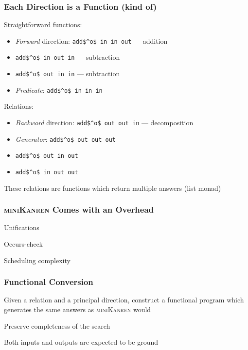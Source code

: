 \documentclass[xcolor=table]{beamer}
\newcommand{\mk}{\textsc{miniKanren}\xspace}
\begin{document}
\begin{frame}[fragile]
  \frametitle{Each Direction is a Function \pause (kind of)}
Straightforward functions:
\begin{itemize}
  \item \emph{Forward} direction: \lstinline{add$^o$ in in out} --- addition
  \item \lstinline{add$^o$ in out in} --- subtraction
  \item \lstinline{add$^o$ out in in} --- subtraction
  \item \emph{Predicate}: \lstinline{add$^o$ in in in}
\end{itemize}

\vfill

Relations:
\begin{itemize}
  \item \emph{Backward} direction: \lstinline{add$^o$ out out in} --- decomposition
  \item \emph{Generator}: \lstinline{add$^o$ out out out}
  \item \lstinline{add$^o$ out in out}
  \item \lstinline{add$^o$ in out out}
\end{itemize}
These relations are functions which return multiple answers (list monad)
\end{frame}

\begin{frame}[fragile]
  \frametitle{\mk Comes with an Overhead}
  \begin{center}
    Unifications
  \end{center}

  \begin{center}
    Occurs-check
  \end{center}

  \begin{center}
    Scheduling complexity
  \end{center}
\end{frame}

\begin{frame}[fragile]
  \frametitle{Functional Conversion}
\begin{center}
  Given a relation and a principal direction, construct a functional program which generates the same answers as \mk would
\end{center}

\vfill

\begin{center}
  Preserve completeness of the search
\end{center}

\vfill

\begin{center}
Both inputs and outputs are expected to be ground
\end{center}
\end{frame}
\end{document}
